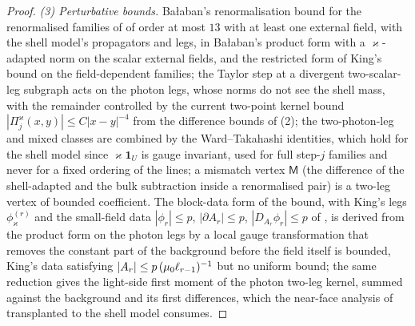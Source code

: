\begin{proof}
\emph{(3) Perturbative bounds.} Ba{\l}aban's renormalisation bound \cite[Prop.~1, (1.33)]{Ba3} for the renormalised families of \cite[\S3.5]{K1} of order at most $13$ with at least one external field, with the shell model's propagators and legs, in Ba{\l}aban's product form with a $\varkappa$-adapted norm on the scalar external fields, and the restricted form of King's bound \cite[(3.38)]{K1} on the field-dependent families; the Taylor step at a divergent two-scalar-leg subgraph acts on the photon legs, whose norms do not see the shell mass, with the remainder controlled by the current two-point kernel bound $|\Pi^\varkappa_j(x,y)|\le C|x-y|^{-4}$ from the difference bounds of (2); the two-photon-leg and mixed classes are combined by the Ward--Takahashi identities, which hold for the shell model since $\varkappa\mathbf 1_U$ is gauge invariant, used for full step-$j$ families and never for a fixed ordering of the lines; a mismatch vertex $\mathsf M$ (the difference of the shell-adapted and the bulk subtraction inside a renormalised pair) is a two-leg vertex of bounded coefficient. The block-data form of the bound, with King's legs $\phi^{(r)}_\varkappa$ and the small-field data $|\phi_r|\le p$, $|\partial A_r|\le p$, $|D_{A_r}\phi_r|\le p$ of \cite[(3.2)]{K1}, is derived from the product form on the photon legs by a local gauge transformation that removes the constant part of the background before the field itself is bounded, King's data satisfying $|A_r|\le p\,(\mu_0\ell_{r-1})^{-1}$ but no uniform bound; the same reduction gives the light-side first moment of the photon two-leg kernel, summed against the background and its first differences, which the near-face analysis of \cite[\S5.2]{K2} transplanted to the shell model consumes. 


\end{proof}
